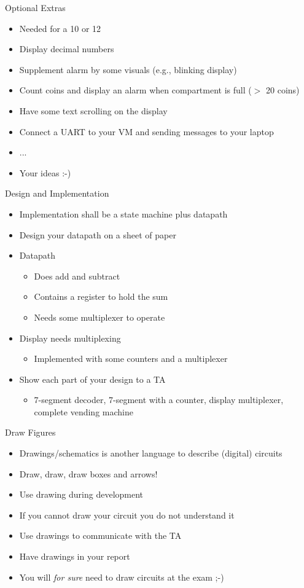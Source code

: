 \begin{frame}[fragile]{Optional Extras}
\begin{itemize}
\item Needed for a 10 or 12
\item Display decimal numbers
\item Supplement alarm by some visuals (e.g., blinking display)
\item Count coins and display an alarm when compartment is full ($>$ 20 coins)
\item Have some text scrolling on the display
\item Connect a UART to your VM and sending messages to your laptop
\item ...
\item Your ideas :-)
\end{itemize}
\end{frame}

\begin{frame}[fragile]{Design and Implementation}
\begin{itemize}
\item Implementation shall be a state machine plus datapath
\item Design your datapath on a sheet of paper
\item Datapath
\begin{itemize}
\item Does add and subtract
\item Contains a register to hold the sum
\item Needs some multiplexer to operate
\end{itemize}
\item Display needs multiplexing
\begin{itemize}
\item Implemented with some counters and a multiplexer
\end{itemize}
\item Show each part of your design to a TA
\begin{itemize}
\item 7-segment decoder, 7-segment with a counter, display multiplexer, complete vending machine
\end{itemize}
\end{itemize}
\end{frame}

\begin{frame}[fragile]{Draw Figures}
\begin{itemize}
\item Drawings/schematics is another language to describe (digital) circuits
\item Draw, draw, draw boxes and arrows!
\item Use drawing during development
\item If you cannot draw your circuit you do not understand it
\item Use drawings to communicate with the TA
\item Have drawings in your report
\item You will \emph{for sure} need to draw circuits at the exam ;-)
\end{itemize}
\end{frame}


